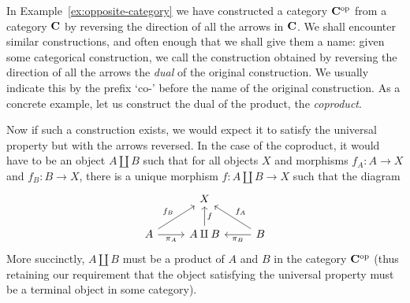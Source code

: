 \begin{example}[Coproducts]
    In Example~\ref{ex:opposite-category} we have constructed a category
    \(\mathbf{C}^{\mathrm{op}}\) from a category \(\mathbf{C}\) by reversing the direction of
    all the arrows in \(\mathbf{C}\). We shall encounter similar constructions,
    and often enough that we shall give them a name: given some categorical
    construction, we call the construction obtained by reversing the direction
    of all the arrows the \emph{dual} of the original construction. We usually
    indicate this by the prefix `co-' before the name of the original
    construction. As a concrete example, let us construct the dual of the
    product, the \emph{coproduct}.

    Now if such a construction exists, we would expect it to satisfy the
    universal property but with the arrows reversed. In the case of the
    coproduct, it would have to be an object \(A \amalg B\) such that for all
    objects \(X\) and morphisms \(f_A: A \to X\) and \(f_B: B \to X\), there is
    a unique morphism \(f: A \amalg B \to X\) such that the diagram
    \[
        \begin{tikzcd}
            & X                          &                                         \\
            A \arrow[ru, "f_B"] \arrow[r, "\pi_A"'] & A \amalg B \arrow[u, "f"'] & B \arrow[lu, "f_A"'] \arrow[l, "\pi_B"]
        \end{tikzcd}
    \]
    More succinctly, \(A \amalg B\) must be a product of \(A\) and \(B\) in the
    category \(\mathbf{C}^{\mathrm{op}}\) (thus retaining our requirement that the object
    satisfying the universal property must be a terminal object in some
    category).


\end{example}
